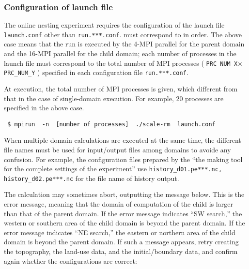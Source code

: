 \subsubsection{Configuration of launch file}
\label{subsubsec:launch}
The online nesting experiment requires the configuration of the launch file \verb|launch.conf|
other than \verb|run.***.conf|.
 must correspond to  in order.
The above case means that
the run is executed by
the 4-MPI parallel for the parent domain 
and the 16-MPI parallel for the child domain;
each number of processes in the launch file 
must correspond to the total number of MPI processes ( \verb|PRC_NUM_X|$\times$\verb|PRC_NUM_Y| )
specified in each configuration file \verb|run.***.conf|.

At execution, the total number of MPI processes is given, which different from that in the case of single-domain execution. For example, 20 processes are specified in the above case.
\begin{verbatim}
 $ mpirun  -n  [number of processes]  ./scale-rm  launch.conf
\end{verbatim}

When multiple domain calculations are executed at the same time,
the different file names must be used for input/output files
among domains to avoide any confusion.
For example, the configuration files prepared by the 
``the making tool for the complete settings of the experiment''
use \verb|history_d01.pe***.nc, history_d02.pe***.nc| for the file name of history output.

The calculation may sometimes abort, outputting the message below. This is the error message, meaning that the domain of computation of the child  is larger than that of the parent domain. If the error message indicates ``SW search,'' the western or southern area of the child domain is beyond the parent domain. If the error message indicates ``NE search,'' the eastern or northern area of the child domain is beyond the parent domain. If such a message appears, retry creating the topography, the land-use data, and the initial/boundary data, and confirm again whether the configurations are correct:



